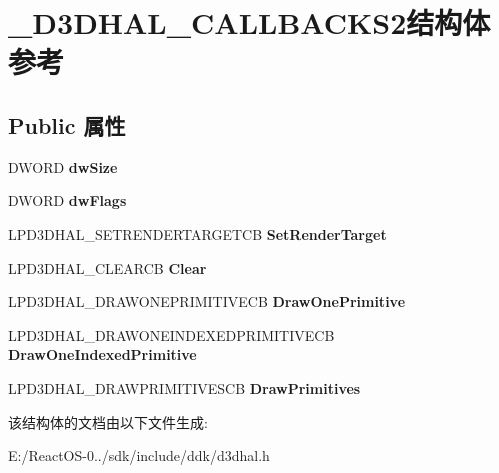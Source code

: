 \hypertarget{struct___d3_d_h_a_l___c_a_l_l_b_a_c_k_s2}{}\section{\+\_\+\+D3\+D\+H\+A\+L\+\_\+\+C\+A\+L\+L\+B\+A\+C\+K\+S2结构体 参考}
\label{struct___d3_d_h_a_l___c_a_l_l_b_a_c_k_s2}
\subsection*{Public 属性}
\begin{DoxyCompactItemize}
\item 
\mbox{\label{struct___d3_d_h_a_l___c_a_l_l_b_a_c_k_s2_a69539d54c51447f7422f38a64ec76521}} 
D\+W\+O\+RD {\bfseries dw\+Size}
\item 
\mbox{\label{struct___d3_d_h_a_l___c_a_l_l_b_a_c_k_s2_a8ac97d8db4ba50bb8ced42a7c68b8164}} 
D\+W\+O\+RD {\bfseries dw\+Flags}
\item 
\mbox{\label{struct___d3_d_h_a_l___c_a_l_l_b_a_c_k_s2_a81eb6347a01a8369760765495489331d}} 
L\+P\+D3\+D\+H\+A\+L\+\_\+\+S\+E\+T\+R\+E\+N\+D\+E\+R\+T\+A\+R\+G\+E\+T\+CB {\bfseries Set\+Render\+Target}
\item 
\mbox{\label{struct___d3_d_h_a_l___c_a_l_l_b_a_c_k_s2_a12b0230d8c5e4de5a4d1fbf47e398c24}} 
L\+P\+D3\+D\+H\+A\+L\+\_\+\+C\+L\+E\+A\+R\+CB {\bfseries Clear}
\item 
\mbox{\label{struct___d3_d_h_a_l___c_a_l_l_b_a_c_k_s2_afc53ffc0db0d4676436cd237c77903b9}} 
L\+P\+D3\+D\+H\+A\+L\+\_\+\+D\+R\+A\+W\+O\+N\+E\+P\+R\+I\+M\+I\+T\+I\+V\+E\+CB {\bfseries Draw\+One\+Primitive}
\item 
\mbox{\label{struct___d3_d_h_a_l___c_a_l_l_b_a_c_k_s2_ac981a18d731a2a12b510fbce9390a7b0}} 
L\+P\+D3\+D\+H\+A\+L\+\_\+\+D\+R\+A\+W\+O\+N\+E\+I\+N\+D\+E\+X\+E\+D\+P\+R\+I\+M\+I\+T\+I\+V\+E\+CB {\bfseries Draw\+One\+Indexed\+Primitive}
\item 
\mbox{\label{struct___d3_d_h_a_l___c_a_l_l_b_a_c_k_s2_ab9df6764ece8b9a7ec4e1f0fdcf81f9e}} 
L\+P\+D3\+D\+H\+A\+L\+\_\+\+D\+R\+A\+W\+P\+R\+I\+M\+I\+T\+I\+V\+E\+S\+CB {\bfseries Draw\+Primitives}
\end{DoxyCompactItemize}


该结构体的文档由以下文件生成\+:\begin{DoxyCompactItemize}
\item 
E\+:/\+React\+O\+S-\/0../sdk/include/ddk/d3dhal.\+h\end{DoxyCompactItemize}
